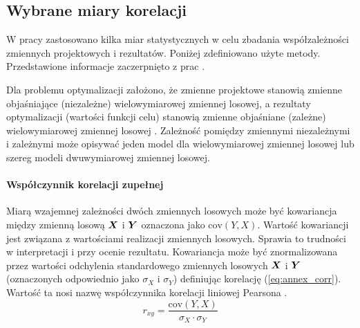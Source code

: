 
\renewcommand{\appendixname}{Załącznik}
\begin{appendices}

\chapter{Wybrane miary korelacji} \label{annex:correlations}

\setcounter{figure}{0}   
\setcounter{equation}{0}   

W pracy zastosowano kilka miar statystycznych w celu zbadania współzależności zmiennych projektowych i rezultatów. Poniżej zdefiniowano użyte metody. Przedstawione informacje zaczerpnięto z prac \cite{Czaja2000,Vargha2013,Tabachnick}.

Dla problemu optymalizacji założono, że zmienne projektowe stanowią zmienne objaśniające (niezależne) wielowymiarowej zmiennej losowej, a rezultaty optymalizacji (wartości funkcji celu) stanowią zmienne objaśniane (zależne) wielowymiarowej zmiennej losowej \cite{Czaja2000}. Zależność pomiędzy zmiennymi niezależnymi i zależnymi może opisywać jeden model dla wielowymiarowej zmiennej losowej lub szereg modeli dwuwymiarowej zmiennej losowej.

\subsubsection{Współczynnik korelacji zupełnej}
Miarą wzajemnej zależności dwóch zmiennych losowych może być kowariancja między zmienną losową $\bm{X}$ i $\bm{Y}$ oznaczona jako $\mathrm{cov}(Y,X)$. Wartość kowariancji jest związana z wartościami realizacji zmiennych losowych. Sprawia to trudności w interpretacji i przy ocenie rezultatu. Kowariancja może być znormalizowana przez wartości odchylenia standardowego zmiennych losowych $\bm{X}$ i $\bm{Y}$ (oznaczonych odpowiednio jako $\sigma_X$ i $\sigma_Y$) definiując korelację (\ref{eq:annex_corr}). Wartość ta nosi nazwę współczynnika korelacji liniowej Pearsona .
\begin{equation} \label{eq:annex_corr}
	r_{xy}=\frac{\mathrm{cov}(Y,X)}{\sigma_X\cdot\sigma_Y}
\end{equation}


\end{appendices}
